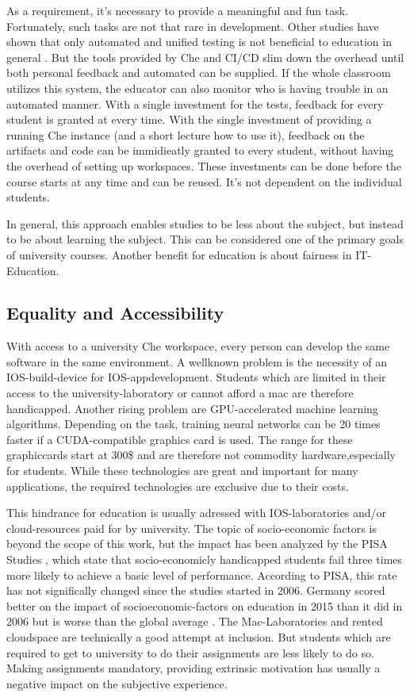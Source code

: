 \documentclass[utf8]{lni}
\begin{document}
As a requirement, it's necessary to provide a meaningful and fun task. 
Fortunately, such tasks are not that rare in development.  
Other studies have shown that only automated and unified testing is not beneficial to education in general \cite{TC88}. 
But the tools provided by Che and CI/CD slim down the overhead until both personal feedback and automated can be supplied. 
If the whole classroom utilizes this system, the educator can also monitor who is having trouble in an automated manner. 
With a single investment for the tests, feedback for every student is granted at every time. 
With the single investment of providing a running Che instance (and a short lecture how to use it), feedback on the artifacts and code can be immidieatly granted to every student, without having the overhead of setting up workspaces. 
These investments can be done before the course starts at any time and can be reused.
It's not dependent on the individual students. 

In general, this approach enables studies to be less about the subject, but instead to be about learning the subject. 
This can be considered one of the primary goals of university courses. 
Another benefit for education is about fairness in IT-Education.  

\subsection{Equality and Accessibility}
With access to a university Che workspace, every person can develop the same software in the same environment. 
A wellknown problem is the necessity of an IOS-build-device for IOS-appdevelopment.
Students which are limited in their access to the university-laboratory or cannot afford a mac are therefore handicapped.
Another  rising  problem  are  GPU-accelerated  machine learning algorithms. 
Depending on the task, training neural networks can be 20 times faster if a CUDA-compatible graphics card is used. 
The range for these graphiccards start at 300\$ and are therefore not commodity hardware,especially for students.  
While these technologies are great and important for many applications, the required technologies are exclusive due to  their  costs.

This  hindrance  for  education  is  usually adressed  with  IOS-laboratories  and/or  cloud-resources paid for by university. 
The topic of socio-economic factors is beyond the scope of this work, but the impact has been analyzed by the PISA Studies \cite{PISA15}, which state that socio-economicly handicapped students fail three times more likely to achieve a basic level of performance.
According to PISA, this rate has not significally changed since the studies started in 2006. 
Germany scored better on the impact of socioeconomic-factors on education in 2015 than it did in 2006 but is worse than the global average \cite{OECDCN15}.
The Mac-Laboratories and rented cloudspace are technically a good attempt at inclusion. 
But students which are required to get to university to do their assignments are 
less  likely  to  do  so.
Making  assignments  mandatory, providing extrinsic motivation \cite{DECI93} has usually a negative impact on the subjective experience.
\end{document}
